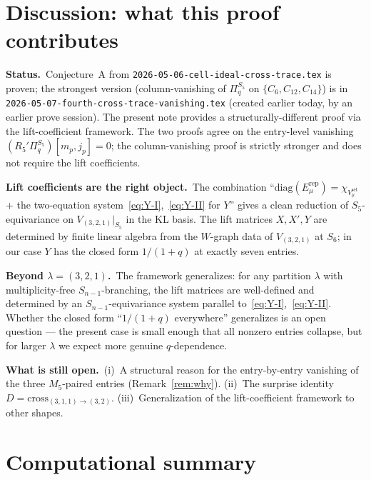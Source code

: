 \documentclass[11pt]{article}
\theoremstyle{definition}
\begin{document}
\section{Discussion: what this proof contributes}\label{sec:discussion}

\textbf{Status.}~Conjecture~A from \texttt{2026-05-06-cell-ideal-cross-trace.tex} is proven; the strongest version (column-vanishing of $\Pi_q^{S_5}$ on $\{C_6, C_{12}, C_{14}\}$) is in \texttt{2026-05-07-fourth-cross-trace-vanishing.tex} (created earlier today, by an earlier prove session). The present note provides a structurally-different proof via the lift-coefficient framework. The two proofs agree on the entry-level vanishing $(R_5'\Pi_q^{S_5})[m_p, j_p] = 0$; the column-vanishing proof is strictly stronger and does not require the lift coefficients.

\textbf{Lift coefficients are the right object.}~The combination ``$\mathrm{diag}(E_\mu^{\mathrm{rep}}) = \chi_{V_\mu^{\mathrm{set}}}$ + the two-equation system~\eqref{eq:Y-I},~\eqref{eq:Y-II} for $Y$'' gives a clean reduction of $S_5$-equivariance on $V_{(3,2,1)}|_{S_5}$ in the KL basis. The lift matrices $X, X', Y$ are determined by finite linear algebra from the $W$-graph data of $V_{(3,2,1)}$ at $S_6$; in our case $Y$ has the closed form $1/(1+q)$ at exactly seven entries.

\textbf{Beyond $\lambda = (3,2,1)$.}~The framework generalizes: for any partition $\lambda$ with multiplicity-free $S_{n-1}$-branching, the lift matrices are well-defined and determined by an $S_{n-1}$-equivariance system parallel to~\eqref{eq:Y-I},~\eqref{eq:Y-II}. Whether the closed form ``$1/(1+q)$ everywhere'' generalizes is an open question --- the present case is small enough that all nonzero entries collapse, but for larger $\lambda$ we expect more genuine $q$-dependence.

\textbf{What is still open.}~(i)~A structural reason for the entry-by-entry vanishing of the three $M_5$-paired entries (Remark~\ref{rem:why}). (ii)~The surprise identity $D = \mathrm{cross}_{(3,1,1)\to(3,2)}$. (iii)~Generalization of the lift-coefficient framework to other shapes.

\section*{Computational summary}
\end{document}
